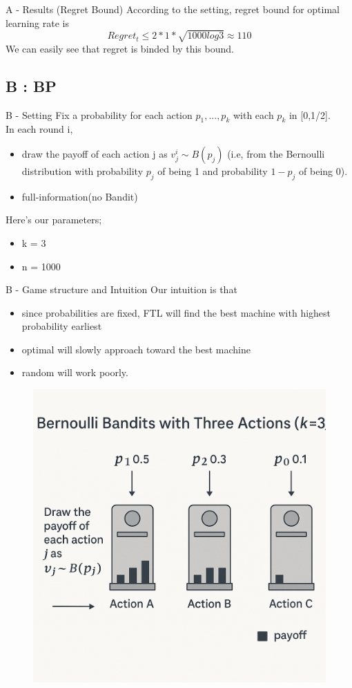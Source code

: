 \documentclass{beamer}
\begin{document}
\begin{frame}{A - Results (Regret Bound)}
According to the setting, regret bound for optimal learning rate is
\[Regret_t \leq 2 * 1 * \sqrt{1000log3} \approx 110\]
We can easily see that regret is binded by this bound.
\end{frame}

\subsection{B : BP}

\begin{frame}{B - Setting}
    Fix a probability for each action $p_{1},...,p_{k}$ with each $p_{k}$ in [0,1/2].\\
    In each round i,
    \begin{itemize}
        \item draw the payoff of each action j as $v^{i}_{j} \sim B(p_{j})$ (i.e, from the Bernoulli distribution with probability $p_j$ of being 1 and probability $1-p_{j}$ of being 0).
        \item full-information(no Bandit)
    \end{itemize}
    \vspace{1em}
    Here's our parameters;
    \begin{itemize}
        \item k = 3
        \item n = 1000
    \end{itemize}
\end{frame}

\begin{frame}{B - Game structure and Intuition}
    Our intuition is that 
    \begin{itemize}
        \item since probabilities are fixed, FTL will find the best machine with highest probability earliest
        \item optimal will slowly approach toward the best machine
        \item random will work poorly.
    \end{itemize}
    \begin{figure}
        \centering
        \includegraphics[width=0.4\linewidth]{../figures/Image_B.png}
        \label{fig:placeholder}
    \end{figure}
\end{frame}
\end{document}

